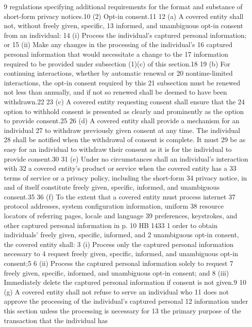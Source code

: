 9 regulations specifying additional requirements for the format and
substance of short-form privacy notices.10
(2) Opt-in consent.11
12 (a) A covered entity shall not, without freely given, specific,
13 informed, and unambiguous opt-in consent from an individual:
14 (i) Process the individual's captured personal information; or
15 (ii) Make any changes in the processing of the individual's
16 captured personal information that would necessitate a change to the
17 information required to be provided under subsection (1)(c) of this
section.18
19 (b) For continuing interactions, whether by automatic renewal or
20 nontime-limited interactions, the opt-in consent required by this
21 subsection must be renewed not less than annually, and if not so
renewed shall be deemed to have been withdrawn.22
23 (c) A covered entity requesting consent shall ensure that the
24 option to withhold consent is presented as clearly and prominently as
the option to provide consent.25
26 (d) A covered entity shall provide a mechanism for an individual
27 to withdraw previously given consent at any time. The individual
28 shall be notified when the withdrawal of consent is complete. It must
29 be as easy for an individual to withdraw their consent as it is for
the individual to provide consent.30
31 (e) Under no circumstances shall an individual's interaction with
32 a covered entity's product or service when the covered entity has a
33 terms of service or a privacy policy, including the short-form
34 privacy notice, in and of itself constitute freely given, specific,
informed, and unambiguous consent.35
36 (f) To the extent that a covered entity must process internet
37 protocol addresses, system configuration information, uniform
38 resource locators of referring pages, locale and language
39 preferences, keystrokes, and other captured personal information in
p. 10 HB 1433
1 order to obtain individuals' freely given, specific, informed, and
2 unambiguous opt-in consent, the covered entity shall:
3 (i) Process only the captured personal information necessary to
4 request freely given, specific, informed, and unambiguous opt-in
consent;5
6 (ii) Process the captured personal information solely to request
7 freely given, specific, informed, and unambiguous opt-in consent; and
8 (iii) Immediately delete the captured personal information if
consent is not given.9
10 (g) A covered entity shall not refuse to serve an individual who
11 does not approve the processing of the individual's captured personal
12 information under this section unless the processing is necessary for
13 the primary purpose of the transaction that the individual has
